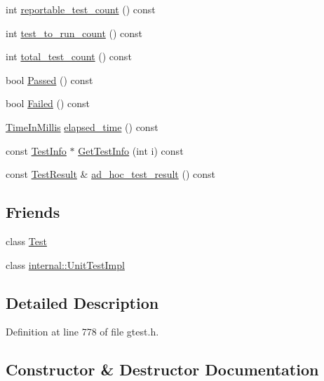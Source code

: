 \begin{DoxyCompactItemize}
int \hyperlink{classtesting_1_1_test_case_a7693150fa71d460a19b291ed6f5c18bd}{reportable\+\_\+test\+\_\+count} () const 
\item 
int \hyperlink{classtesting_1_1_test_case_a47de0cf87858370388275c9d995f1ff4}{test\+\_\+to\+\_\+run\+\_\+count} () const 
\item 
int \hyperlink{classtesting_1_1_test_case_ac7b2ed22822735b7b9ae2740162332c9}{total\+\_\+test\+\_\+count} () const 
\item 
bool \hyperlink{classtesting_1_1_test_case_ad093a04334d7eb8d707a7f1a321b040f}{Passed} () const 
\item 
bool \hyperlink{classtesting_1_1_test_case_a5c0922d310f860e78cca7e215f2fa0e4}{Failed} () const 
\item 
\hyperlink{namespacetesting_a992de1d091ce660f451d1e8b3ce30fd6}{Time\+In\+Millis} \hyperlink{classtesting_1_1_test_case_a80f163d2826ba8586fffb41e8d686727}{elapsed\+\_\+time} () const 
\item 
const \hyperlink{classtesting_1_1_test_info}{Test\+Info} $\ast$ \hyperlink{classtesting_1_1_test_case_a9a7d5757d4b352cda2dddd0fda714a88}{Get\+Test\+Info} (int i) const 
\item 
const \hyperlink{classtesting_1_1_test_result}{Test\+Result} \& \hyperlink{classtesting_1_1_test_case_a3993481a8f0c2253653b5e1ec5934432}{ad\+\_\+hoc\+\_\+test\+\_\+result} () const 
\end{DoxyCompactItemize}
\subsection*{Friends}
\begin{DoxyCompactItemize}
\item 
class \hyperlink{classtesting_1_1_test_case_a5b78b1c2e1fa07ffed92da365593eaa4}{Test}
\item 
class \hyperlink{classtesting_1_1_test_case_acc0a5e7573fd6ae7ad1878613bb86853}{internal\+::\+Unit\+Test\+Impl}
\end{DoxyCompactItemize}


\subsection{Detailed Description}


Definition at line 778 of file gtest.\+h.



\subsection{Constructor \& Destructor Documentation}
